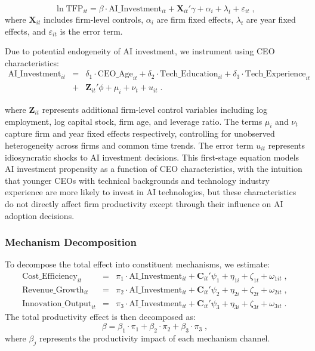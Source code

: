 \documentclass[12pt, a4paper]{article}
\begin{document}
\begin{equation}
\ln \text{TFP}_{it} = \beta \cdot \text{AI}\_\text{Investment}_{it} + \mathbf{X}_{it}'\gamma + \alpha_i + \lambda_t + \varepsilon_{it} \;,
\end{equation}
where $\mathbf{X}_{it}$ includes firm-level controls, $\alpha_i$ are firm fixed effects, $\lambda_t$ are year fixed effects, and $\varepsilon_{it}$ is the error term.

Due to potential endogeneity of AI investment, we instrument using CEO characteristics:
\begin{eqnarray}
\text{AI}\_\text{Investment}_{it} &=& \delta_1 \cdot \text{CEO}\_\text{Age}_{it} + \delta_2 \cdot \text{Tech}\_\text{Education}_{it} 
+ \delta_3 \cdot \text{Tech}\_\text{Experience}_{it} \nonumber \\
&+& \mathbf{Z}_{it}'\phi + \mu_i + \nu_t + u_{it} \;.
\end{eqnarray}

where $\mathbf{Z}_{it}$ represents additional firm-level control variables including log employment, log capital stock, firm age, and leverage ratio. The terms $\mu_i$ and $\nu_t$ capture firm and year fixed effects respectively, controlling for unobserved heterogeneity across firms and common time trends. The error term $u_{it}$ represents idiosyncratic shocks to AI investment decisions. This first-stage equation models AI investment propensity as a function of CEO characteristics, with the intuition that younger CEOs with technical backgrounds and technology industry experience are more likely to invest in AI technologies, but these characteristics do not directly affect firm productivity except through their influence on AI adoption decisions.

\subsubsection{Mechanism Decomposition}
To decompose the total effect into constituent mechanisms, we estimate:
\begin{eqnarray}
\text{Cost}\_\text{Efficiency}_{it} &=& \pi_1 \cdot \text{AI}\_\text{Investment}_{it} + \mathbf{C}_{it}'\psi_1 + \eta_{1i} + \zeta_{1t} + \omega_{1it} \;, \\
\text{Revenue}\_\text{Growth}_{it} &=& \pi_2 \cdot \text{AI}\_\text{Investment}_{it} + \mathbf{C}_{it}'\psi_2 + \eta_{2i} + \zeta_{2t} + \omega_{2it}  \;, \\
\text{Innovation}\_\text{Output}_{it} &=& \pi_3 \cdot \text{AI}\_\text{Investment}_{it} + \mathbf{C}_{it}'\psi_3 + \eta_{3i} + \zeta_{3t} + \omega_{3it} \;.
\end{eqnarray}
The total productivity effect is then decomposed as:
\begin{equation}
\beta = \beta_1 \cdot \pi_1 + \beta_2 \cdot \pi_2 + \beta_3 \cdot \pi_3 \;,
\end{equation}
where $\beta_j$ represents the productivity impact of each mechanism channel.
\end{document}

